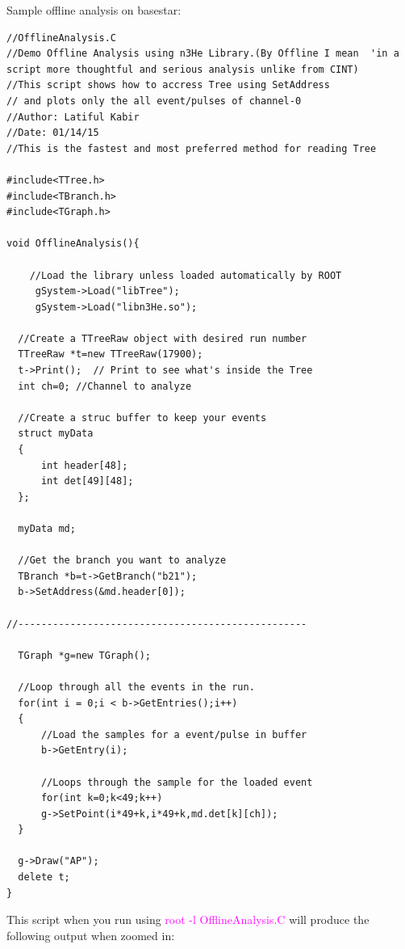 \documentclass[12pt]{article}
\begin{document}
Sample offline analysis on basestar:
\begin{lstlisting}
//OfflineAnalysis.C
//Demo Offline Analysis using n3He Library.(By Offline I mean  'in a script more thoughtful and serious analysis unlike from CINT)
//This script shows how to accress Tree using SetAddress
// and plots only the all event/pulses of channel-0
//Author: Latiful Kabir
//Date: 01/14/15
//This is the fastest and most preferred method for reading Tree 

#include<TTree.h>
#include<TBranch.h>
#include<TGraph.h>

void OfflineAnalysis(){

    //Load the library unless loaded automatically by ROOT
     gSystem->Load("libTree");
     gSystem->Load("libn3He.so");
 
  //Create a TTreeRaw object with desired run number
  TTreeRaw *t=new TTreeRaw(17900);
  t->Print();  // Print to see what's inside the Tree
  int ch=0; //Channel to analyze

  //Create a struc buffer to keep your events 
  struct myData
  {
      int header[48];
      int det[49][48];  
  };

  myData md;
  
  //Get the branch you want to analyze
  TBranch *b=t->GetBranch("b21");
  b->SetAddress(&md.header[0]);

//--------------------------------------------------

  TGraph *g=new TGraph();

  //Loop through all the events in the run.
  for(int i = 0;i < b->GetEntries();i++)
  {
      //Load the samples for a event/pulse in buffer
      b->GetEntry(i);

      //Loops through the sample for the loaded event
      for(int k=0;k<49;k++)
 	  g->SetPoint(i*49+k,i*49+k,md.det[k][ch]);
  }

  g->Draw("AP");
  delete t;
}
\end{lstlisting}


This script when you run using \textcolor{magenta}{root -l OfflineAnalysis.C} will produce the following output when zoomed in:
\end{document}
